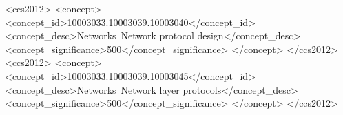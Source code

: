 \documentclass[sigconf]{acmart}
\begin{document}


\renewcommand{\shortauthors}{Bruno P. Santos et al.}
\renewcommand{\shorttitle}{Mobile Matrix}

\begin{abstract}

\end{abstract}

%
%

\begin{CCSXML}
<ccs2012>
<concept>
<concept_id>10003033.10003039.10003040</concept_id>
<concept_desc>Networks~Network protocol design</concept_desc>
<concept_significance>500</concept_significance>
</concept>
</ccs2012>
<ccs2012>
<concept>
<concept_id>10003033.10003039.10003045</concept_id>
<concept_desc>Networks~Network layer protocols</concept_desc>
<concept_significance>500</concept_significance>
</concept>
</ccs2012>
\end{CCSXML}




\end{document}
